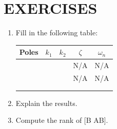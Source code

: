 \documentclass[11pt,a4paper]{article}
\begin{document}
\section{EXERCISES}
\begin{enumerate}
\item Fill in the following table:
\begin{center}
\begin{tabular}{| >{\centering}p{3cm} | >{\centering}p{.75cm} | >{\centering}p{.75cm} | c | c |}
	\hline
	 Poles & $k_{1}$ & $k_{2}$ & $\zeta$ & $\omega_{n}$ \\ \hline
	 & & & N/A & N/A \\ \hline
	 & & & N/A & N/A \\ \hline
	 & & & & \\ \hline
	 & & & & \\ \hline
\end{tabular}
\end{center}

\item Explain the results.
\item Compute the rank of [B AB]. 
\end{enumerate}
\end{document}
